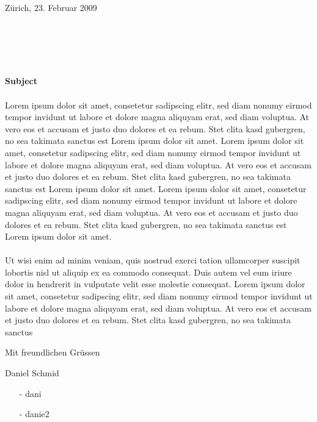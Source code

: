 \documentclass[a4paper,12pt]{letter}
\begin{document}
\thispagestyle{fancy}
\renewcommand{\headrulewidth}{0pt}

\hspace{90mm}Zürich, 23. Februar 2009
\\\par\hspace{88mm}
\usebox{\areturn}\\
\hspace{90mm}\parbox[t][20mm]{50mm}{\hspace{90mm}\fromName \\ \fromStreet \\ \fromPlace } 
\vspace{20mm}
\par 
\textbf{Subject} \\\\
Lorem ipsum dolor sit amet, consetetur sadipscing elitr, sed diam nonumy eirmod tempor invidunt ut labore et dolore magna aliquyam erat, sed diam voluptua. At vero eos et accusam et justo duo dolores et ea rebum. Stet clita kasd gubergren, no sea takimata sanctus est Lorem ipsum dolor sit amet. Lorem ipsum dolor sit amet, consetetur sadipscing elitr, sed diam nonumy eirmod tempor invidunt ut labore et dolore magna aliquyam erat, sed diam voluptua. At vero eos et accusam et justo duo dolores et ea rebum. Stet clita kasd gubergren, no sea takimata sanctus est Lorem ipsum dolor sit amet. Lorem ipsum dolor sit amet, consetetur sadipscing elitr, sed diam nonumy eirmod tempor invidunt ut labore et dolore magna aliquyam erat, sed diam voluptua. At vero eos et accusam et justo duo dolores et ea rebum. Stet clita kasd gubergren, no sea takimata sanctus est Lorem ipsum dolor sit amet.   \\\\
Ut wisi enim ad minim veniam, quis nostrud exerci tation ullamcorper suscipit lobortis nisl ut aliquip ex ea commodo consequat. Duis autem vel eum iriure dolor in hendrerit in vulputate velit esse molestie consequat. 
Lorem ipsum dolor sit amet, consetetur sadipscing elitr, sed diam nonumy eirmod tempor invidunt ut labore et dolore magna aliquyam erat, sed diam voluptua. At vero eos et accusam et justo duo dolores et ea rebum. Stet clita kasd gubergren, no sea takimata sanctus  
\vspace{10mm}
\par\hspace{90mm}Mit freundlichen Grüssen
\par\vspace{15mm}\hspace{90mm}Daniel Schmid
\begin{itemize}
\item [-] dani
\item [-] danie2 
\end{itemize}
\end{document}
